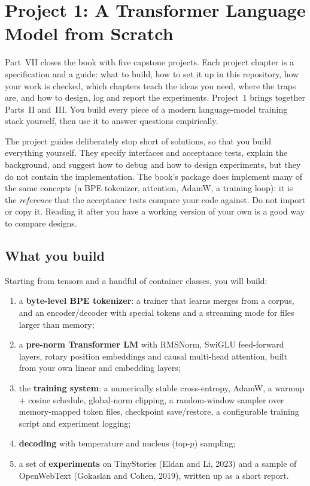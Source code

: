\chapter{Project 1: A Transformer Language Model from Scratch}\label{ch:proj1}

Part~VII closes the book with five capstone projects. Each project chapter is a specification
and a guide: what to build, how to set it up in this repository, how your work is checked, which
chapters teach the ideas you need, where the traps are, and how to design, log and report the
experiments. Project~1 brings together Parts~II and~III. You build every piece of a modern
language-model training stack yourself, then use it to answer questions empirically.

\begin{keyidea}
The project guides deliberately stop short of solutions, so that you build everything yourself.
They specify interfaces and acceptance tests, explain the background, and suggest how to debug
and how to design experiments, but they do not contain the implementation. The book's
 package does implement many of the same concepts (a BPE tokenizer, attention, AdamW,
a training loop): it is the \emph{reference} that the acceptance tests compare your code against.
Do not import or copy it. Reading it after you have a working version of your own is a good way
to compare designs.
\end{keyidea}

\section{What you build}\label{sec:proj1:overview}

Starting from tensors and a handful of container classes, you will build:

\begin{enumerate}
  \item a \textbf{byte-level BPE tokenizer}: a trainer that learns merges from a corpus, and an
        encoder/decoder with special tokens and a streaming mode for files larger than memory;
  \item a \textbf{pre-norm Transformer LM} with RMSNorm, SwiGLU feed-forward layers, rotary
        position embeddings and causal multi-head attention, built from your own linear and
        embedding layers;
  \item the \textbf{training system}: a numerically stable cross-entropy, AdamW, a warmup + cosine
        schedule, global-norm clipping, a random-window sampler over memory-mapped token files,
        checkpoint save/restore, a configurable training script and experiment logging;
  \item \textbf{decoding} with temperature and nucleus (top-$p$) sampling;
  \item a set of \textbf{experiments} on TinyStories (Eldan and Li, 2023) and a sample of
        OpenWebText (Gokaslan and Cohen, 2019), written up as a short report.
\end{enumerate}

